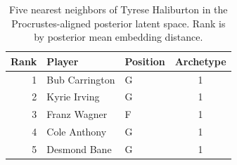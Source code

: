\begin{table}[htbp]
  \centering\small
  \begin{tabular}{rllc}
    \toprule
    Rank & Player & Position & Archetype \\
    \midrule
    1 & Bub Carrington & G & 1 \\
    2 & Kyrie Irving & G & 1 \\
    3 & Franz Wagner & F & 1 \\
    4 & Cole Anthony & G & 1 \\
    5 & Desmond Bane & G & 1 \\
    \bottomrule
  \end{tabular}
  \caption{Five nearest neighbors of Tyrese Haliburton in the Procrustes-aligned posterior latent space. Rank is by posterior mean embedding distance.}
  \label{tab:Tyrese_Haliburton_neighbors}
\end{table}

